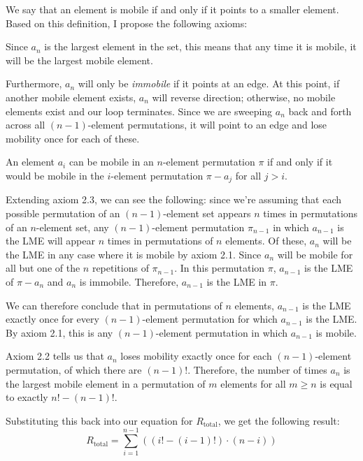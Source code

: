 \documentclass[10pt, oneside]{article}   	%
\begin{document}
We say that an element is mobile if and only if it points to a smaller element. Based on this definition, I propose the following axioms:
\begin{axiom}
	Since $a_{n}$ is the largest element in the set, this means that any time it is mobile, it will be the largest mobile element.
\end{axiom}
\begin{axiom}
	Furthermore, $a_{n}$ will only be \emph{immobile} if it points at an edge. At this point, if another mobile element exists, $a_{n}$ will reverse direction; otherwise, no mobile elements exist and our loop terminates. Since we are sweeping $a_{n}$ back and forth across all $(n - 1)$-element permutations, it will point to an edge and lose mobility once for each of these.
\end{axiom}
\begin{axiom}
	An element $a_{i}$ can be mobile in an $n$-element permutation $\pi$ if and only if it would be mobile in the $i$-element permutation $\pi - a_{j}$ for all $j > i$.
\end{axiom}
Extending axiom 2.3, we can see the following: since we're assuming that each possible permutation of an $(n - 1)$-element set appears $n$ times in permutations of an $n$-element set, any $(n - 1)$-element permutation $\pi_{n - 1}$ in which $a_{n - 1}$ is the LME will appear $n$ times in permutations of $n$ elements. Of these, $a_{n}$ will be the LME in any case where it is mobile by axiom 2.1. Since $a_{n}$ will be mobile for all but one of the $n$ repetitions of $\pi_{n - 1}$. In this permutation $\pi$, $a_{n - 1}$ is the LME of $\pi - a_{n}$ and $a_{n}$ is immobile. Therefore, $a_{n - 1}$ is the LME in $\pi$.

We can therefore conclude that in permutations of $n$ elements, $a_{n - 1}$ is the LME exactly once for every $(n - 1)$-element permutation for which $a_{n - 1}$ is the LME. By axiom 2.1, this is any $(n - 1)$-element permutation in which $a_{n - 1}$ is mobile.

Axiom 2.2 tells us that $a_{n}$ loses mobility exactly once for each $(n - 1)$-element permutation, of which there are $(n - 1)!$. Therefore, the number of times $a_{n}$ is the largest mobile element in a permutation of $m$ elements for all $m \geq n$ is equal to exactly $n! - (n - 1)!$.

Substituting this back into our equation for $R_{\text{total}}$, we get the following result:
\[
	R_{\text{total}} = \sum_{i = 1}^{n - 1} \left( \left( i! - (i - 1)! \right) \cdot \left( n - i \right) \right)
\]
\end{document}
